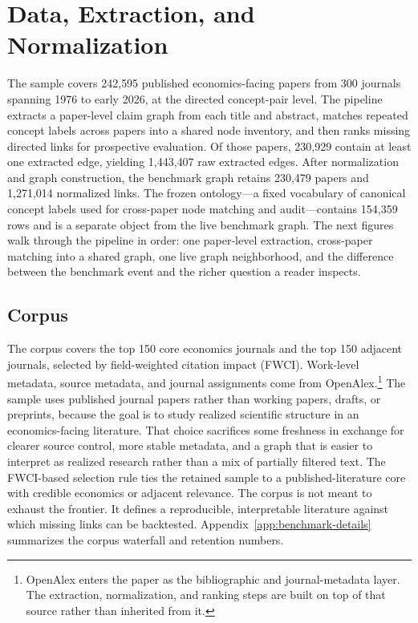 \documentclass[11pt]{article}
\begin{document}
\section{Data, Extraction, and Normalization}
\label{sec:data}

The sample covers 242{,}595 published economics-facing papers from 300 journals spanning 1976 to early 2026, at the directed concept-pair level. The pipeline extracts a paper-level claim graph from each title and abstract, matches repeated concept labels across papers into a shared node inventory, and then ranks missing directed links for prospective evaluation. Of those papers, 230{,}929 contain at least one extracted edge, yielding 1{,}443{,}407 raw extracted edges. After normalization and graph construction, the benchmark graph retains 230{,}479 papers and 1{,}271{,}014 normalized links. The frozen ontology---a fixed vocabulary of canonical concept labels used for cross-paper node matching and audit---contains 154{,}359 rows and is a separate object from the live benchmark graph. The next figures walk through the pipeline in order: one paper-level extraction, cross-paper matching into a shared graph, one live graph neighborhood, and the difference between the benchmark event and the richer question a reader inspects.

\subsection{Corpus}

The corpus covers the top 150 core economics journals and the top 150 adjacent journals, selected by field-weighted citation impact (FWCI). Work-level metadata, source metadata, and journal assignments come from OpenAlex.\footnote{OpenAlex enters the paper as the bibliographic and journal-metadata layer. The extraction, normalization, and ranking steps are built on top of that source rather than inherited from it.} The sample uses published journal papers rather than working papers, drafts, or preprints, because the goal is to study realized scientific structure in an economics-facing literature. That choice sacrifices some freshness in exchange for clearer source control, more stable metadata, and a graph that is easier to interpret as realized research rather than a mix of partially filtered text. The FWCI-based selection rule ties the retained sample to a published-literature core with credible economics or adjacent relevance. The corpus is not meant to exhaust the frontier. It defines a reproducible, interpretable literature against which missing links can be backtested. Appendix~\ref{app:benchmark-details} summarizes the corpus waterfall and retention numbers.
\end{document}
